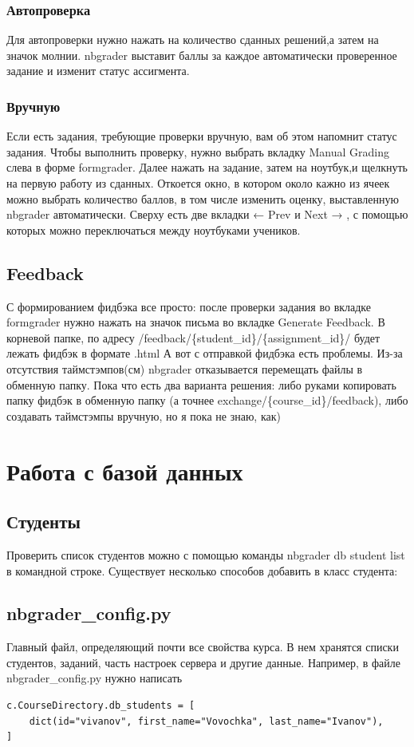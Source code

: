 \documentclass[a4paper,12pt]{article}
\begin{document}
\subsubsection{Автопроверка}

Для автопроверки нужно нажать на количество сданных решений,а затем на значок молнии. nbgrader выставит баллы за каждое автоматически проверенное задание и изменит статус ассигмента. 
\subsubsection{Вручную}

Если есть задания, требующие проверки вручную, вам об этом напомнит статус задания. Чтобы выполнить проверку, нужно выбрать вкладку Manual Grading слева в форме formgrader. Далее нажать на задание, затем на ноутбук,и щелкнуть на первую работу из сданных. Откоется окно, в котором около кажно из ячеек можно выбрать количество баллов, в том числе изменить оценку, выставленную nbgrader автоматически. Сверху есть две вкладки ← Prev и Next → , с помощью которых можно переключаться между ноутбуками учеников.
\subsection{Feedback}

С формированием фидбэка все просто: после проверки задания во вкладке formgrader нужно нажать на значок письма во вкладке Generate Feedback. В корневой папке, по адресу /feedback/\{student\_id\}/\{assignment\_id\}/ будет лежать фидбэк в формате .html
А вот с отправкой фидбэка есть проблемы. Из-за отсутствия таймстэмпов(см) nbgrader отказывается перемещать файлы в обменную папку. Пока что есть два варианта решения: либо руками копировать папку фидбэк в обменную папку (а точнее exchange/\{course\_id\}/feedback), либо создавать таймстэмпы вручную, но я пока не знаю, как)
\section{Работа с базой данных}

\subsection{Студенты}

Проверить список студентов можно с помощью команды  nbgrader db student list в командной строке.
Существует несколько способов добавить в класс студента:
\subsection{nbgrader\_config.py}
Главный файл, определяющий почти все свойства курса. В нем хранятся списки студентов, заданий, часть настроек сервера и другие данные.
Например, в файле nbgrader\_config.py нужно написать
\begin{verbatim}
c.CourseDirectory.db_students = [
    dict(id="vivanov", first_name="Vovochka", last_name="Ivanov"),
]
\end{verbatim}
\end{document}
